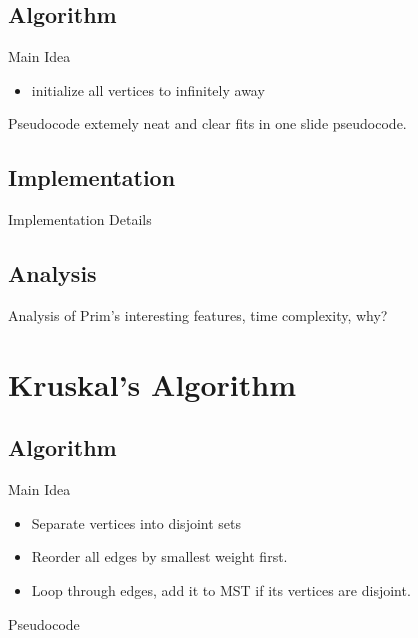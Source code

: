 \documentclass{beamer}
\begin{document}
\subsection{Algorithm}
\begin{frame}{Main Idea}
    \begin{itemize}
    \item initialize all vertices to infinitely away
    \end{itemize}
\end{frame}

\begin{frame}{Pseudocode}
    extemely neat and clear fits in one slide pseudocode.
\end{frame}

\subsection{Implementation}
\begin{frame}{Implementation Details}
\end{frame}

\subsection{Analysis}
\begin{frame}{Analysis of Prim's}
    interesting features, time complexity, why?
\end{frame}


\section{Kruskal's Algorithm}\frame{\sectionpage}
\subsection{Algorithm}
\begin{frame}{Main Idea}
    \begin{itemize}
    \item Separate vertices into disjoint sets
    \item Reorder all edges by smallest weight first.
    \item Loop through edges, add it to MST if its vertices are disjoint.
    \end{itemize}
\end{frame}


\begin{frame}{Pseudocode}
\vkruskal
\end{frame}
\end{document}
